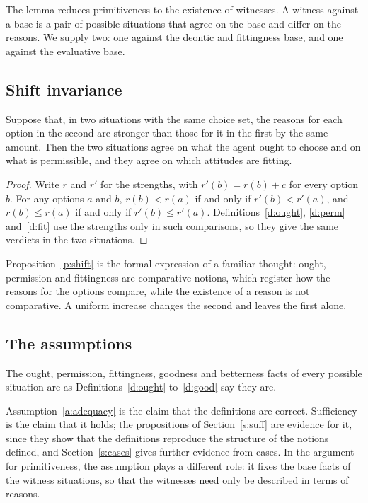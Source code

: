 \documentclass{situationist-preprint}
\begin{document}
The lemma reduces primitiveness to the existence of witnesses. A witness against a base is a pair of possible situations that agree on the base and differ on the reasons. We supply two: one against the deontic and fittingness base, and one against the evaluative base.

\subsection{Shift invariance}

\begin{proposition}\label{p:shift}
Suppose that, in two situations with the same choice set, the reasons for each option in the second are stronger than those for it in the first by the same amount. Then the two situations agree on what the agent ought to choose and on what is permissible, and they agree on which attitudes are fitting.
\end{proposition}

\begin{proof}
Write $r$ and $r'$ for the strengths, with $r'(b)=r(b)+c$ for every option $b$. For any options $a$ and $b$, $r(b)<r(a)$ if and only if $r'(b)<r'(a)$, and $r(b)\le r(a)$ if and only if $r'(b)\le r'(a)$. Definitions~\ref{d:ought}, \ref{d:perm} and~\ref{d:fit} use the strengths only in such comparisons, so they give the same verdicts in the two situations.
\end{proof}

Proposition~\ref{p:shift} is the formal expression of a familiar thought: ought, permission and fittingness are comparative notions, which register how the reasons for the options compare, while the existence of a reason is not comparative. A uniform increase changes the second and leaves the first alone.

\subsection{The assumptions}

\begin{assumption}[Adequacy]\label{a:adequacy}
The ought, permission, fittingness, goodness and betterness facts of every possible situation are as Definitions~\ref{d:ought} to~\ref{d:good} say they are.
\end{assumption}

Assumption~\ref{a:adequacy} is the claim that the definitions are correct. Sufficiency is the claim that it holds; the propositions of Section~\ref{s:suff} are evidence for it, since they show that the definitions reproduce the structure of the notions defined, and Section~\ref{s:cases} gives further evidence from cases. In the argument for primitiveness, the assumption plays a different role: it fixes the base facts of the witness situations, so that the witnesses need only be described in terms of reasons.
\end{document}
